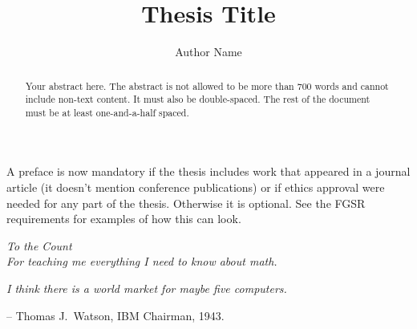 \documentclass[12pt]{report}          %
\title{Thesis Title} %
\author{Author Name}
\begin{document}
\preamblepagenumbering %
\titlepage %


\begin{abstract}
Your abstract here. 
The abstract is not allowed to be more than 700 words and cannot include non-text content.
It must also be double-spaced. 
The rest of the document must be at least one-and-a-half spaced.
\end{abstract}


\doublespacing


\begin{preface} 
A preface is now mandatory if the thesis includes work that appeared in a journal article (it doesn't mention conference publications) or if ethics approval were needed for any part of the thesis.
Otherwise it is optional.
See the FGSR requirements for examples of how this can look.
\end{preface}


\begin{dedication}
	\vspace*{1in}
	\begin{center}
	         \emph{To the Count} \\
             \emph{For teaching me everything I need to know about math.}
	\end{center}
\end{dedication}

\begin{quotepage}
 \vspace*{1in}
 \begin{center}
	\emph{I think there is a world market for maybe five computers.}
	\begin{flushright}
		-- Thomas J.\ Watson, IBM Chairman, 1943.
	\end{flushright}
 \end{center}
\end{quotepage}
\end{document}
